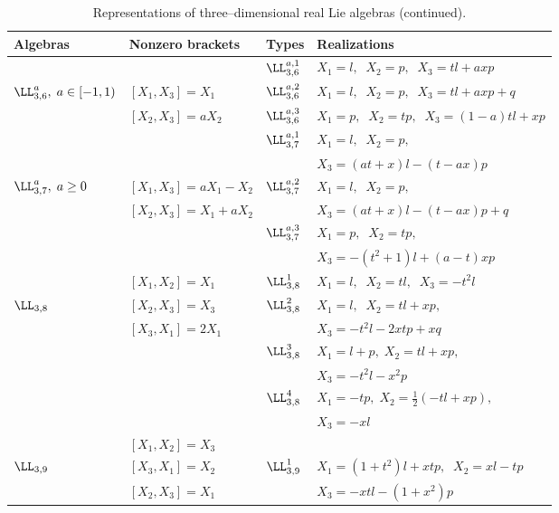 \begin{table}
\label{t2}
\begin{center}
\caption{Representations of three--dimensional real Lie algebras (continued).}

\begin{tabular}{|l|l|l|l|}
\hline
Algebras & Nonzero brackets & Types & Realizations\\
\hline
&  & $\LL_{3,6}^{a,1}$ & $X_1=l,\;\;X_2=p,\;\;X_3=tl+axp$\\
\cline{3-4}
$\LL_{3,6}^a,\;a\in [-1,1)$ & $[X_1,X_3]=X_1$ & $\LL_{3,6}^{a,2}$ &
$ X_1=l,\;\;X_2=p,\;\;X_3=tl+axp+q$ \\
\cline{3-4}
 & $[X_2,X_3]=aX_2$ & $\LL_{3,6}^{a,3}$ & $X_1=p,\;\; X_2=tp,\;\; 
 X_3=(1-a)tl+xp$\\
\hline
  &  & $\LL_{3,7}^{a,1}$ & $X_1=l,\;\;X_2=p, $\\
  &  &    & $X_3 =(at+x)l-(t-ax)p$\\     
\cline{3-4}
$\LL_{3,7}^a,\;a\ge 0$ & $[X_1,X_3]=aX_1-X_2$ & $\LL_{3,7}^{a,2}$ &
$ X_1=l,\;\;X_2=p,$ \\
   & $[X_2,X_3]=X_1+aX_2$ &  & $X_3=(at+x)l-(t-ax)p+q$\\
\cline{3-4}
 &  & $\LL_{3,7}^{a,3}$ & $X_1=p,\;\; X_2=tp,$ \\
 &  &   &   $ X_3=-(t^2+1)l+(a-t)xp$\\
\hline
 & $ [X_1,X_2]=X_1$ & $\LL_{3,8}^1$ & $X_1=l,\;\;X_2=tl,\;\;X_3=-t^2l$\\  
 \cline{3-4}
$\LL_{3,8}$ & $ [X_2,X_3]=X_3$ & $\LL_{3,8}^2$ 
& $X_1=l,\;\;X_2=tl+xp,$\\    
 & $[X_3,X_1]=2X_1$&   & $X_3=-t^2l-2xtp+xq$ \\
\cline{3-4}
 &  & $\LL_{3,8}^3$ & $X_1=l+p,\;X_2=tl+xp,$\\
 &  &  & $X_3=-t^2l-x^2p$\\
\cline{3-4}
& & $\LL_{3,8}^4$ & $X_1=-tp,\;X_2=\displaystyle{\frac{1}{2}}(-tl+xp),$\\
&  &  & $X_3=-xl$\\
\hline
  &  $[X_1,X_2]=X_3$ &   &  \\
$\LL_{3,9}$ & $ [X_3,X_1]=X_2$ & 
$\LL_{3,9}^1$ & $X_1=(1+t^2)l+xtp,\;\;X_2=xl-tp$\\  
 &  $[X_2,X_3]=X_1$ &  & $X_3=-xtl-(1+x^2)p$  \\
\hline
\end{tabular}
\end{center}
\end{table}

%
 
